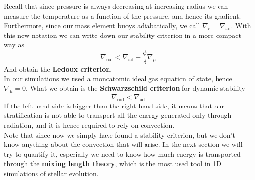 \documentclass[11pt]{article}
\begin{document}
Recall that since pressure is always decreasing at increasing radius we can measure the temperature as a function of the pressure, and hence its gradient. Furthermore, since our mass element buoys adiabatically, we call $\nabla_e=\nabla_{\mathrm{ad}}$. 
With this new notation we can write down our stability criterion in a more compact way as
\begin{equation}\label{stabcritcomp}
	\nabla_{\mathrm{rad}} < \nabla_{\mathrm{ad}} + \frac{\phi}{\delta} \nabla_{\mu}
\end{equation}
And obtain the \textbf{Ledoux criterion}. \\
In our simulations we used a monoatomic ideal gas equation of state, hence $\nabla_{\mu}=0$.  What we obtain is the \textbf{Schwarzschild criterion} for dynamic stability
\begin{equation}\label{schwarzschild}
	\nabla_{\mathrm{rad}}<\nabla_{\mathrm{ad}}
\end{equation}
If the left hand side is bigger than the right hand side, it means that our stratification is not able to transport all the energy generated only through radiation, and it is hence required to rely on convection. \\
Note that since now we simply have found a stability criterion, but we don't know anything about the convection that will arise. In the next section we will try to quantify it, especially we need to know how much energy is transported through the \textbf{mixing length theory}, which is the most used tool in 1D simulations of stellar evolution.
\end{document}
